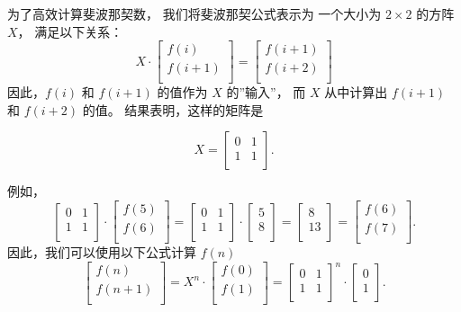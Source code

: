\begin{samepage}
为了高效计算斐波那契数，
我们将斐波那契公式表示为
一个大小为 $2 \times 2$ 的方阵 $X$，
满足以下关系：
\[ X \cdot
 \begin{bmatrix}
  f(i) \\
  f(i+1) \\
 \end{bmatrix}
=
 \begin{bmatrix}
  f(i+1) \\
  f(i+2) \\
 \end{bmatrix}
 \]
因此，$f(i)$ 和 $f(i+1)$ 的值作为
$X$ 的''输入''，
而 $X$ 从中计算出 $f(i+1)$ 和 $f(i+2)$ 的值。
结果表明，这样的矩阵是

\[ X = 
 \begin{bmatrix}
  0 & 1 \\
  1 & 1 \\
 \end{bmatrix}.
\]
\end{samepage}
\noindent
例如，
\[
 \begin{bmatrix}
  0 & 1 \\
  1 & 1 \\
 \end{bmatrix}
\cdot
 \begin{bmatrix}
  f(5) \\
  f(6) \\
 \end{bmatrix}
=
 \begin{bmatrix}
  0 & 1 \\
  1 & 1 \\
 \end{bmatrix}
\cdot
 \begin{bmatrix}
  5 \\
  8 \\
 \end{bmatrix}
=
 \begin{bmatrix}
  8 \\
  13 \\
 \end{bmatrix}
=
 \begin{bmatrix}
  f(6) \\
  f(7) \\
 \end{bmatrix}.
\]
因此，我们可以使用以下公式计算 $f(n)$
\[
 \begin{bmatrix}
  f(n) \\
  f(n+1) \\
 \end{bmatrix}
=
X^n \cdot
 \begin{bmatrix}
  f(0) \\
  f(1) \\
 \end{bmatrix}
=
 \begin{bmatrix}
  0 & 1 \\
  1 & 1 \\
 \end{bmatrix}^n
\cdot
 \begin{bmatrix}
  0 \\
  1 \\
 \end{bmatrix}.
\]
